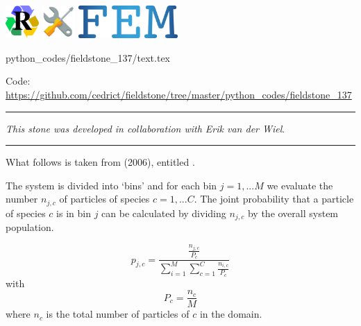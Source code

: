 \includegraphics[height=1.25cm]{images/pictograms/replication}
\includegraphics[height=1.25cm]{images/pictograms/tools}
\includegraphics[height=1.25cm]{images/pictograms/FEM}


\begin{flushright} {\tiny {\color{gray} python\_codes/fieldstone\_137/text.tex}} \end{flushright}

%

\begin{center}
\inpython
Code: \url{https://github.com/cedrict/fieldstone/tree/master/python_codes/fieldstone_137}
\end{center}

\par\noindent\rule{\textwidth}{0.4pt}

{\sl This stone was developed in collaboration with Erik van der Wiel}. 

\par\noindent\rule{\textwidth}{0.4pt}

What follows is taken from \textcite{cakm06} (2006), entitled . 

The system is divided into `bins' and for each bin $j=1,...M$ we evaluate 
the number $n_{j,c}$ of particles of species $c=1,...C$.
The joint probability that a particle of species $c$
is in bin $j$ can be calculated by dividing $n_{j,c}$ by the overall system population.

\begin{equation}
p_{j,c} = \frac{\frac{n_{j,c}}{P_c}}{\sum\limits_{i=1}^M \sum\limits_{c=1}^C \frac{n_{i,c}}{P_c}}
\label{eq:shannon1}
\end{equation}
with 
\[
P_c = \frac{n_c}{M}
\]
where $n_c$ is the total number of particles of $c$ in the domain.

